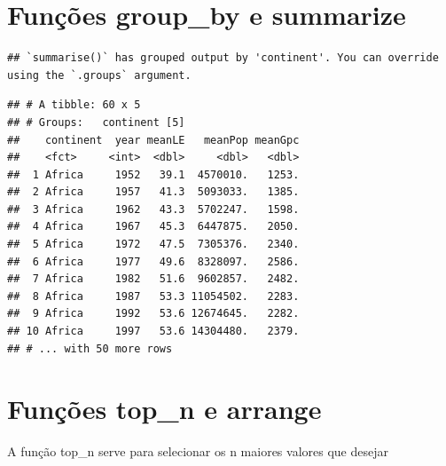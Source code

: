 \documentclass[
]{article}
\newenvironment{Shaded}{\begin{snugshade}}{\end{snugshade}}
\newcommand{\DataTypeTok}[1]{\textcolor[rgb]{0.13,0.29,0.53}{#1}}
\newcommand{\DecValTok}[1]{\textcolor[rgb]{0.00,0.00,0.81}{#1}}
\newcommand{\KeywordTok}[1]{\textcolor[rgb]{0.13,0.29,0.53}{\textbf{#1}}}
\newcommand{\NormalTok}[1]{#1}
\newcommand{\OperatorTok}[1]{\textcolor[rgb]{0.81,0.36,0.00}{\textbf{#1}}}
\newcommand{\StringTok}[1]{\textcolor[rgb]{0.31,0.60,0.02}{#1}}
\begin{document}
\hypertarget{funuxe7uxf5es-group_by-e-summarize-2}{%
\section{Funções group\_by e
summarize}\label{funuxe7uxf5es-group_by-e-summarize-2}}

\begin{Shaded}
\end{Shaded}

\begin{verbatim}
## `summarise()` has grouped output by 'continent'. You can override using the `.groups` argument.
\end{verbatim}

\begin{verbatim}
## # A tibble: 60 x 5
## # Groups:   continent [5]
##    continent  year meanLE   meanPop meanGpc
##    <fct>     <int>  <dbl>     <dbl>   <dbl>
##  1 Africa     1952   39.1  4570010.   1253.
##  2 Africa     1957   41.3  5093033.   1385.
##  3 Africa     1962   43.3  5702247.   1598.
##  4 Africa     1967   45.3  6447875.   2050.
##  5 Africa     1972   47.5  7305376.   2340.
##  6 Africa     1977   49.6  8328097.   2586.
##  7 Africa     1982   51.6  9602857.   2482.
##  8 Africa     1987   53.3 11054502.   2283.
##  9 Africa     1992   53.6 12674645.   2282.
## 10 Africa     1997   53.6 14304480.   2379.
## # ... with 50 more rows
\end{verbatim}

\hypertarget{funuxe7uxf5es-top_n-e-arrange}{%
\section{Funções top\_n e arrange}\label{funuxe7uxf5es-top_n-e-arrange}}

A função top\_n serve para selecionar os n maiores valores que desejar

\begin{Shaded}
\end{Shaded}
\end{document}
